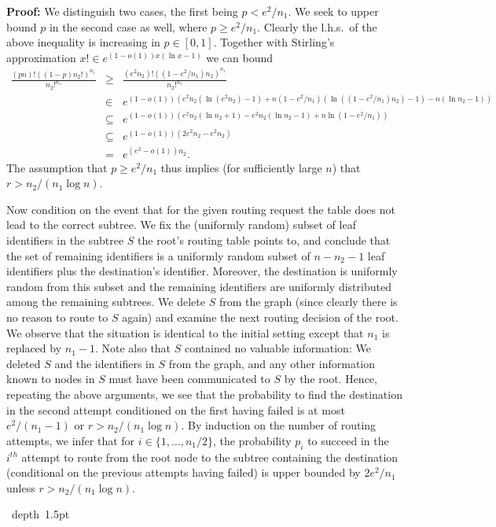 \documentclass[letterpaper,11pt]{article}
\newcommand{\blackslug}{\hbox{\hskip 1pt \vrule width 4pt height 8pt
depth 1.5pt \hskip 1pt}}
\newcommand{\QED}{\quad\blackslug\lower 8.5pt\null\par}
\newenvironment{proof}[1][Proof:]{\noindent \textbf{#1}\xspace}{\QED}
\begin{document}
\begin{proof}
We distinguish two cases, the first being $p< e^2/n_1$. We seek to upper
bound $p$ in the second case as well, where $p\geq e^2/n_1$. Clearly the l.h.s.\
of the above inequality is increasing in $p\in [0,1]$. Together with Stirling's
approximation $x!\in e^{(1-o(1))x(\ln x-1)}$ we can bound
\begin{eqnarray*}
\frac{(pn)!((1-p)n_2!)^{n_1}}{n_2!^{n_1}}&\geq &
\frac{(e^2n_2)!((1-e^2/n_1)n_2)^{n_1}}{n_2!^{n_1}} \\
&\in & 
e^{(1-o(1))(e^2n_2(\ln (e^2n_2)-1)+n(1-e^2/n_1)(\ln((1-e^2/n_1)n_2)-1)
-n(\ln n_2-1))}\\
&\subseteq & 
e^{(1-o(1))(e^2n_2(\ln n_2+1)-e^2n_2(\ln n_2-1)+n \ln(1-e^2/n_1))}\\
&\subseteq & 
e^{(1-o(1))(2e^2n_2-e^2n_2)}\\
&=& e^{(e^2-o(1))n_2}.
\end{eqnarray*}
The assumption that $p\geq e^2/n_1$ thus implies (for sufficiently large $n$)
that $r>n_2/(n_1\log n)$.

Now condition on the event that for the given routing request the table
does not lead to the correct subtree. We fix the (uniformly random) subset of
leaf identifiers in the subtree $S$ the root's routing table points to, and
conclude that the set of remaining identifiers is a uniformly random subset of
$n-n_2-1$ leaf identifiers plus the destination's identifier. Moreover, the
destination is uniformly random from this subset and the remaining identifiers
are uniformly distributed among the remaining subtrees. We delete $S$ from the
graph (since clearly there is no reason to route to $S$ again) and examine the
next routing decision of the root. We observe that the situation is identical to
the initial setting except that $n_1$ is replaced by $n_1-1$. Note also that $S$
contained no valuable information: We deleted $S$ and the identifiers in $S$
from the graph, and any other information known to nodes in $S$ must have been
communicated to $S$ by the root. Hence, repeating the above arguments, we see
that the probability to find the destination in the second attempt conditioned
on the first having failed is at most $e^2/(n_1-1)$ or $r>n_2/(n_1\log n)$.
By induction on the number of routing attempts, we infer that for $i\in
\{1,\ldots,n_1/2\}$, the probability $p_i$ to succeed in the $i^{th}$ attempt to
route from the root node to the subtree containing the destination (conditional
on the previous attempts having failed) is upper bounded by $2e^2/n_1$ unless
$r>n_2/(n_1\log n)$.


\end{proof}
\end{document}
